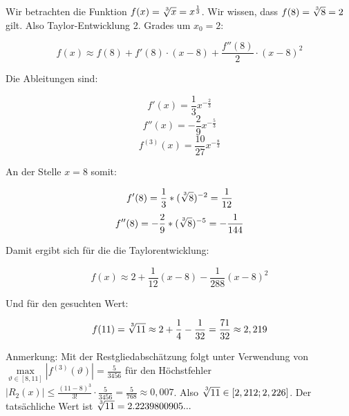 \item Wir betrachten die Funktion $f(x) = \nroot{3}{x} = x^\frac{1}{3}$. Wir wissen, dass $f(8) = \nroot{3}{8} = 2$ gilt. Also Taylor-Entwicklung 2. Grades um $x_0=2$:

$$f(x) \approx f(8) + f'(8) \cdot (x-8) + \frac{f''(8)}{2} \cdot (x-8)^2$$

Die Ableitungen sind:

$$f'(x) = \frac{1}{3} x^{-\frac{2}{3}}$$
$$f''(x) = -\frac{2}{9} x^{-\frac{5}{3}} $$
$$f^{(3)}(x) = \frac{10}{27} x^{-\frac{8}{3}} $$


An der Stelle $x=8$ somit:

$$f'(8) = \frac{1}{3} * (\nroot{3}{8})^{-2} = \frac{1}{12}$$
$$f''(8) = - \frac{2}{9} * (\nroot{3}{8})^{-5} = -\frac{1}{144}$$

Damit ergibt sich für die die Taylorentwicklung:

$$f(x) \approx 2 +\frac{1}{12}(x-8) - \frac{1}{288} (x-8)^2$$

Und für den gesuchten Wert:

$$f(11) = \nroot{3}{11} \approx 2 + \frac{1}{4} - \frac{1}{32} = \frac{71}{32} \approx 2,219$$

Anmerkung: Mit der Restgliedabschätzung folgt unter Verwendung von $\max\limits_{\vartheta \in [8,11]}|f^{(3)}(\vartheta)| = \frac{5}{3456}$ für den Höchstfehler $|R_2(x)| \leq \frac{(11-8)^3}{3!}\cdot\frac{5}{3456} = \frac{5}{768} \approx 0,007$. Also $\nroot{3}{11} \in [2,212;2,226]$. Der tatsächliche Wert ist $\nroot{3}{11} = 2.2239800905...$
